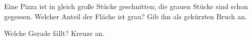 \documentclass[11pt]{article}
\begin{document}
\begin{aufgabe}{\begin{minipage}[t]{0.6\linewidth}Eine Pizza ist in gleich große Stücke geschnitten; die grauen Stücke sind schon gegessen. Welcher Anteil der Fläche ist grau? Gib ihn als gekürzten Bruch an. \leerfeld\end{minipage}\hfill\begin{minipage}[t]{0.37\linewidth}\vspace{0pt}
\end{minipage}}
\end{aufgabe}

\begin{aufgabe}{\begin{minipage}[t]{0.6\linewidth}Welche Gerade fällt? Kreuze an. \\  \end{minipage}\hfill\begin{minipage}[t]{0.37\linewidth}\vspace{0pt}
\begin{ksys}[xmin=-5,xmax=5,ymin=-5,ymax=5,klein]   \end{ksys}
\end{minipage}}
\end{aufgabe}
\end{document}
